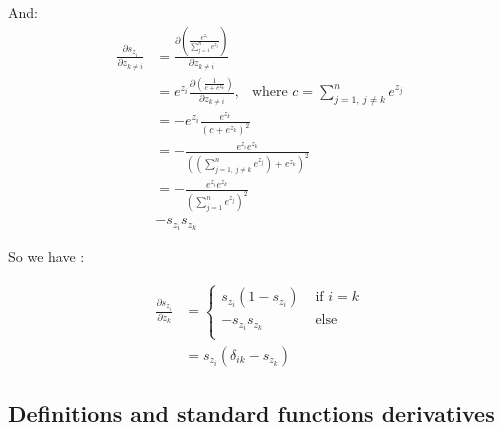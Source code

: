 \documentclass[11pt,a4paper]{report}
\begin{document}
And:
\begin{equation}
\begin{split}
    \frac{\partial s_{z_{i}}}{\partial z_{k\neq i}}  &= \frac{\partial \left(\frac{e^{z_i}}{\sum\limits_{j=1}^{n} e^{z_j}}\right)}{\partial z_{k\neq i}}\\
    &= e^{z_i}\frac{\partial \left(\frac{1}{c + e^{z_{k}}}\right)}{\partial z_{k\neq i}},\ \ \text{ where } c = \sum\limits_{j=1,\ j\neq k}^n e^{z_j}\\
    &= -e^{z_i}\frac{e^{z_k}}{(c+e^{z_{k}})^2}\\
    &= -\frac{e^{z_i}e^{z_k}}{\left(\left(\sum\limits_{j=1,\ j\neq k}^n e^{z_j}\right)+e^{z_{k}}\right)^2}\\
    &= -\frac{e^{z_i}e^{z_k}}{\left(\sum\limits_{j=1}^n e^{z_j}\right)^2}\\
    & - s_{z_i}s_{z_k}
\end{split}
\end{equation}

So we have :

\begin{equation}
\begin{split}
\frac{\partial s_{z_i}}{\partial z_{k}} &= 
    \begin{cases}
       s_{z_i} (1 - s_{z_i}) &\text{ if } i=k\\
       -s_{z_i} s_{z_k} &\text{ else } \\
    \end{cases}\\
    &= s_{z_i}\left( \delta_{ik} - s_{z_k}\right)
\end{split}
\end{equation}

\subsection{Definitions and standard functions derivatives}
\end{document}

